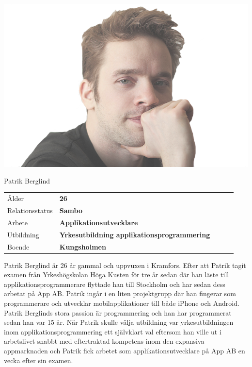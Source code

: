 \includegraphics[scale=0.4]{persona1.png}\\

\vspace{50px}

{\fontsize{1cm}{1em}\selectfont Patrik Berglind}

\vspace{20px}

\begin{tabular}{lllll}
  Ålder & \textbf{26} \\
  Relationsstatus & \textbf{Sambo} \\
  Arbete & \textbf{Applikationsutvecklare}\\
  Utbildning & \textbf{Yrkesutbildning applikationsprogrammering} \\
  Boende & \textbf{Kungsholmen} \\
\end{tabular}

\vspace{20px}

Patrik Berglind är 26 år gammal och uppvuxen i Kramfors. Efter att Patrik tagit examen från Yrkeshögskolan Höga Kusten för tre år sedan där han läste till applikationsprogrammerare flyttade han till Stockholm och har sedan dess arbetat på App AB. Patrik ingår i en liten projektgrupp där han fingerar som programmerare och utvecklar mobilapplikationer till både iPhone och Android. Patrik Berglinds stora passion är programmering och han har programmerat sedan han var 15 år. När Patrik skulle välja utbildning var yrkesutbildningen inom applikationsprogrammering ett självklart val eftersom han ville ut i arbetslivet snabbt med eftertraktad kompetens inom den expansiva appmarknaden och Patrik fick arbetet som applikationsutvecklare på App AB en vecka efter sin examen.


